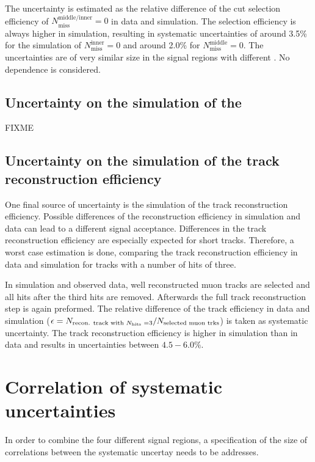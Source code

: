 The uncertainty is estimated as the relative difference of the cut selection efficiency of $N_{\text{miss}}^{\text{middle/inner}}=0$ in data and simulation.
The selection efficiency is always higher in simulation, resulting in systematic uncertainties of around 3.5\% for the simulation of $N_{\text{miss}}^{\text{inner}}=0$ and around 2.0\% for $N_{\text{miss}}^{\text{middle}}=0$.
The uncertainties are of very similar size in the signal regions with different \pt.
No \ias dependence is considered.

\subsection*{Uncertainty on the simulation of the \ias}
FIXME

\subsection*{Uncertainty on the simulation of the track reconstruction efficiency}
One final source of uncertainty is the simulation of the track reconstruction efficiency.
Possible differences of the reconstruction efficiency in simulation and data can lead to a different signal acceptance.
Differences in the track reconstruction efficiency are especially expected for short tracks.
Therefore, a worst case estimation is done, comparing the track reconstruction efficiency in data and simulation for tracks with a number of hits of three.

In simulation and observed data, well reconstructed muon tracks are selected and all hits after the third hits are removed.
Afterwards the full track reconstruction step is again preformed.
The relative difference of the track efficiency in data and simulation ($\epsilon = N_{\text{recon. track with \nhits=3}}/N_{\text{selected muon trks}}$) is taken as systematic uncertainty.
The track reconstruction efficiency is higher in simulation than in data and results in uncertainties between $4.5-6.0\%$.




\section{Correlation of systematic uncertainties}
In order to combine the four different signal regions, a specification of the size of correlations between the systematic uncertay needs to be addresses.



